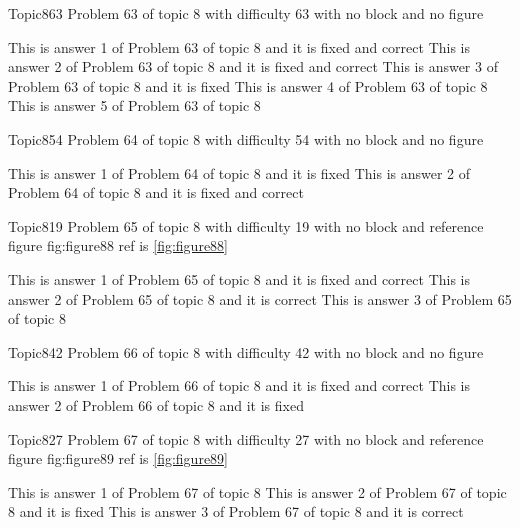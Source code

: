 \documentclass[master]{exam}
\begin{document}
\begin{problem}{Topic8}{63}
	Problem 63 of topic 8 with difficulty 63 with no block and no figure
	\begin{answers}
		 This is answer 1 of Problem 63 of topic 8 and it is fixed and correct
		 This is answer 2 of Problem 63 of topic 8 and it is fixed and correct
		\answer[fixed] This is answer 3 of Problem 63 of topic 8 and it is fixed
		\answer This is answer 4 of Problem 63 of topic 8 
		\answer This is answer 5 of Problem 63 of topic 8 
	\end{answers}
\end{problem}

\begin{problem}{Topic8}{54}
	Problem 64 of topic 8 with difficulty 54 with no block and no figure
	\begin{answers}
		\answer[fixed] This is answer 1 of Problem 64 of topic 8 and it is fixed
		 This is answer 2 of Problem 64 of topic 8 and it is fixed and correct
	\end{answers}
\end{problem}

\begin{problem}{Topic8}{19}
	Problem 65 of topic 8 with difficulty 19 with no block and reference figure fig:figure88 ref is \ref{fig:figure88}
	\begin{answers}
		 This is answer 1 of Problem 65 of topic 8 and it is fixed and correct
		\answer[correct] This is answer 2 of Problem 65 of topic 8 and it is correct
		\answer This is answer 3 of Problem 65 of topic 8 
	\end{answers}
\end{problem}

\begin{problem}{Topic8}{42}
	Problem 66 of topic 8 with difficulty 42 with no block and no figure
	\begin{answers}
		 This is answer 1 of Problem 66 of topic 8 and it is fixed and correct
		\answer[fixed] This is answer 2 of Problem 66 of topic 8 and it is fixed
	\end{answers}
\end{problem}

\begin{problem}{Topic8}{27}
	Problem 67 of topic 8 with difficulty 27 with no block and reference figure fig:figure89 ref is \ref{fig:figure89}
	\begin{answers}
		\answer This is answer 1 of Problem 67 of topic 8 
		\answer[fixed] This is answer 2 of Problem 67 of topic 8 and it is fixed
		\answer[correct] This is answer 3 of Problem 67 of topic 8 and it is correct
	\end{answers}
\end{problem}
\end{document}
